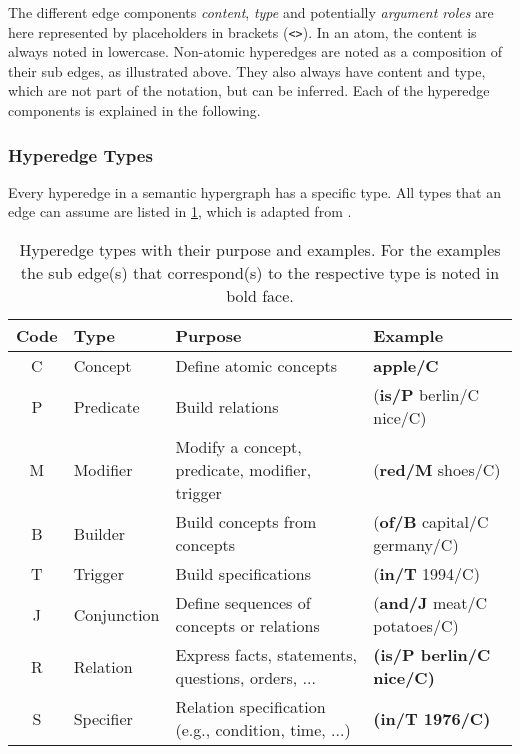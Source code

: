 \documentclass[11pt, numbers=noenddot]{scrreprt}
\let\citef\cite  %
\let\cite\parencite  %
\begin{document}
The different edge components \textit{content}, \textit{type} and potentially \textit{argument roles} are here represented by placeholders in brackets (\texttt{<>}). In an atom, the content is always noted in lowercase. Non-atomic hyperedges are noted as a composition of their sub edges, as illustrated above. They also always have content and type, which are not part of the notation, but can be inferred. Each of the hyperedge components is explained in the following.

\subsubsection{Hyperedge Types}
Every hyperedge in a semantic hypergraph has a specific type. All types that an edge can assume are listed in \cref{tab:hyperedge-types}, which is adapted from \citef[p. 7]{menezesSemanticHypergraphs2021}.

\begin{table}[h]
\centering
\begin{tabular}{clp{5cm}l}
\toprule
\textbf{Code} & \textbf{Type} & \textbf{Purpose} & \textbf{Example} \\
\midrule
\textsf{C} & Concept & Define atomic concepts & \textbf{\textsf{apple/C}} \\
\textsf{P} & Predicate & Build relations & \textsf{(\textbf{is/P} berlin/C nice/C)} \\
\textsf{M} & Modifier & Modify a concept, predicate, modifier, trigger & \textsf{(\textbf{red/M} shoes/C)} \\
\textsf{B} & Builder & Build concepts from concepts & \textsf{(\textbf{of/B} capital/C germany/C)} \\
\textsf{T} & Trigger & Build specifications & \textsf{(\textbf{in/T} 1994/C)} \\
\textsf{J} & Conjunction & Define sequences of concepts or relations & \textsf{(\textbf{and/J} meat/C potatoes/C)} \\
\textsf{R} & Relation & Express facts, statements, questions, orders, ... & \textsf{\textbf{(is/P berlin/C nice/C)}} \\
\textsf{S} & Specifier & Relation specification (e.g., condition, time, ...) & \textsf{\textbf{(in/T 1976/C)}} \\
\bottomrule
\end{tabular}
\caption{Hyperedge types with their purpose and examples. For the examples the sub edge(s) that correspond(s) to the respective type is noted in bold face.}
\label{tab:hyperedge-types}
\end{table}
\end{document}
